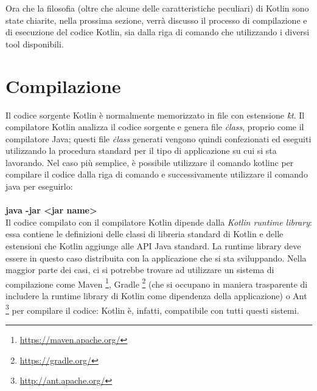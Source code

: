 Ora che la filosofia (oltre che alcune delle caratteristiche peculiari) di Kotlin sono state chiarite, nella prossima sezione, verrà discusso il processo di compilazione e di esecuzione del codice Kotlin, sia dalla riga di comando che utilizzando i diversi tool disponibili.


\section{Compilazione}
Il codice sorgente Kotlin è normalmente memorizzato in file con estensione {\em\.kt}. Il compilatore Kotlin analizza il codice sorgente e genera file {\em\.class}, proprio come il compilatore Java; questi file {\em\.class} generati vengono quindi confezionati ed eseguiti utilizzando la procedura standard per il tipo di applicazione su cui si sta lavorando. Nel caso più semplice, è possibile utilizzare il comando {\ttfamily kotlinc} per compilare il codice dalla riga di comando e successivamente utilizzare il comando {\ttfamily java} per eseguirlo:\\

{\bfseries
{}\\
{\ttfamily java -jar <jar name>}
}\\

Il codice compilato con il compilatore Kotlin dipende dalla {\em Kotlin runtime library}: essa contiene le definizioni delle classi di libreria standard di Kotlin e delle estensioni che Kotlin aggiunge alle API Java standard. La runtime library deve essere in questo caso distribuita con la applicazione che si sta sviluppando. Nella maggior parte dei casi, ci si potrebbe trovare ad utilizzare un sistema di compilazione come Maven \footnote{\url{https://maven.apache.org/}}, Gradle \footnote{\url{https://gradle.org/}} (che si occupano in maniera trasparente di includere la runtime library di Kotlin come dipendenza della applicazione) o Ant \footnote{\url{http://ant.apache.org/}} per compilare il codice: Kotlin è, infatti, compatibile con tutti questi sistemi.\\
